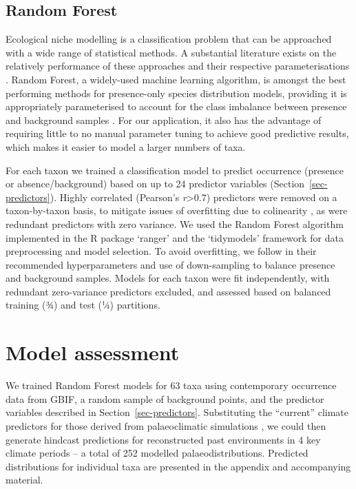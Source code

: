\documentclass[
  authoryear,
  preprint]{elsarticle}
\begin{document}
\subsection{Random Forest}\label{random-forest}

Ecological niche modelling is a classification problem that can be
approached with a wide range of statistical methods. A substantial
literature exists on the relatively performance of these approaches and
their respective parameterisations \citep[reviewed
in][]{ValaviEtAl2022}. Random Forest, a widely-used machine learning
algorithm, is amongst the best performing methods for presence-only
species distribution models, providing it is appropriately parameterised
to account for the class imbalance between presence and background
samples \citep{ValaviEtAl2021, ValaviEtAl2022}. For our application, it
also has the advantage of requiring little to no manual parameter tuning
to achieve good predictive results, which makes it easier to model a
larger numbers of taxa.

For each taxon we trained a classification model to predict occurrence
(presence or absence/background) based on up to 24 predictor variables
(Section~\ref{sec-predictors}). Highly correlated (Pearson's
\emph{r}\textgreater0.7) predictors were removed on a taxon-by-taxon
basis, to mitigate issues of overfitting due to colinearity
\citep{DormannEtAl2013}, as were redundant predictors with zero
variance. We used the Random Forest algorithm implemented in the R
package `ranger' \citep{WrightZiegler2017} and the `tidymodels'
\citep{tidymodels} framework for data preprocessing and model selection.
To avoid overfitting, we follow \citet{ValaviEtAl2021} in their
recommended hyperparameters and use of down-sampling to balance presence
and background samples. Models for each taxon were fit independently,
with redundant zero-variance predictors excluded, and assessed based on
balanced training (¾) and test (¼) partitions.

\section{Model assessment}\label{model-assessment}

We trained Random Forest models for 63 taxa using contemporary
occurrence data from GBIF, a random sample of background points, and the
predictor variables described in Section~\ref{sec-predictors}.
Substituting the ``current'' climate predictors for those derived from
palaeoclimatic simulations \citep{BrownEtAl2018}, we could then generate
hindcast predictions for reconstructed past environments in 4 key
climate periods -- a total of 252 modelled palaeodistributions.
Predicted distributions for individual taxa are presented in the
appendix and accompanying material.
\end{document}
